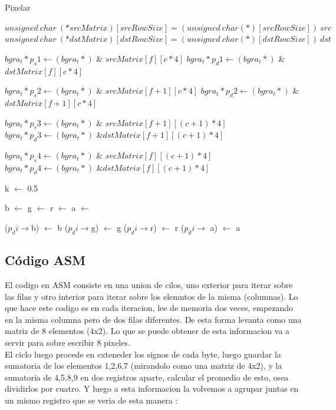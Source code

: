 	\begin{algorithm}[h!]
\caption{Pixelar}
\begin{algorithmic}
	\State $unsigned~ char~ (*srcMatrix)[srcRowSize] = (unsigned~ char (*)[srcRowSize])~ src$
	\State $unsigned~ char~ (*dstMatrix)[dstRowSize] = (unsigned~ char (*)[dstRowSize])~ dst$
	
			\State $bgra_t* p_s1 \gets (bgra_t*)$ \& $srcMatrix[f][c * 4]$
			\State $bgra_t *p_d1 \gets (bgra_t*)$ \&$dstMatrix[f][c * 4]$
			
			\State $bgra_t* p_s2 \gets (bgra_t*)$ \& $srcMatrix[f+1][c * 4]$
			\State $bgra_t *p_d2 \gets (bgra_t*)$ \&$dstMatrix[f+1][c * 4]$
			
			\State $bgra_t* p_s3 \gets (bgra_t*)$ \& $srcMatrix[f+1][(c+1) * 4]$
			\State $bgra_t *p_d3 \gets (bgra_t*)$ \&$dstMatrix[f+1][(c+1) * 4]$
			
			\State $bgra_t* p_s4 \gets (bgra_t*)$ \& $srcMatrix[f][(c+1) * 4]$
			\State $bgra_t *p_d4 \gets (bgra_t*)$ \&$dstMatrix[f][(c+1) * 4]$
			
			\State k $\gets$ 0.5
			
			\State b $\gets$ 
			\State g $\gets$ 
			\State r $\gets$ 
			\State a $\gets$ 
				
				\State ($p_di \rightarrow$b) $\gets$ b
				\State ($p_di \rightarrow$g) $\gets$ g
				\State ($p_di \rightarrow$r) $\gets$ r
				\State ($p_di \rightarrow$ a) $\gets$ a
			\EndFor
		\EndFor
	\EndFor
\EndFunction

\end{algorithmic} 
\end{algorithm}
\subsection{Código ASM}
El codigo en ASM consiste en una union de cilos, uno exterior para iterar sobre las filas y otro interior para iterar sobre los elemntos de la misma (columnas). Lo que hace este codigo es en cada iteracion, lee de memoria dos veces, empezando en la misma columna pero de dos filas diferentes. De esta forma levanta como una matriz de 8 elementos (4x2). Lo que se puede obtener de esta informacion va a servir para sobre escribir 8 pixeles. \\ El ciclo luego procede en exteneder los signos de cada byte, luego guardar la sumatoria de los elementos {1,2,6,7} (mirandolo como una matriz de 4x2), y la sumatoria de {4,5,8,9} en dos registros aparte, calcular el promedio de esto, osea dividirlos por cuatro. Y luego a esta informacion la volvemos a agrupar juntas en un mismo registro que se veria de esta manera :

